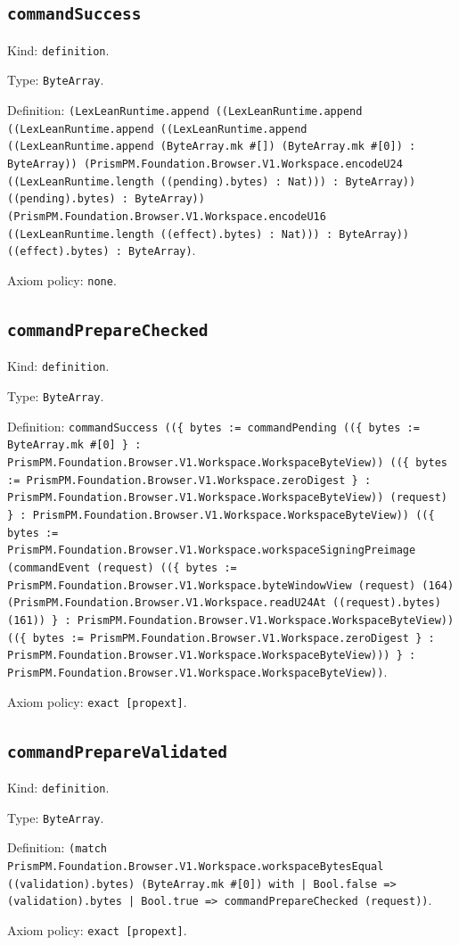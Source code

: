 \documentclass[11pt]{article}
\begin{document}
\subsection*{\texttt{commandSuccess}}
\noindent Kind: \texttt{definition}.\par
\noindent Type: \texttt{ByteArray}.\par
\noindent Definition: \texttt{(LexLeanRuntime.append ((LexLeanRuntime.append ((LexLeanRuntime.append ((LexLeanRuntime.append ((LexLeanRuntime.append (ByteArray.mk \#[]) (ByteArray.mk \#[0]) : ByteArray)) (PrismPM.Foundation.Browser.V1.Workspace.encodeU24 ((LexLeanRuntime.length ((pending).bytes) : Nat))) : ByteArray)) ((pending).bytes) : ByteArray)) (PrismPM.Foundation.Browser.V1.Workspace.encodeU16 ((LexLeanRuntime.length ((effect).bytes) : Nat))) : ByteArray)) ((effect).bytes) : ByteArray)}.\par
\noindent Axiom policy: \texttt{none}.\par
\subsection*{\texttt{commandPrepareChecked}}
\noindent Kind: \texttt{definition}.\par
\noindent Type: \texttt{ByteArray}.\par
\noindent Definition: \texttt{commandSuccess ((\{ bytes := commandPending ((\{ bytes := ByteArray.mk \#[0] \} : PrismPM.Foundation.Browser.V1.Workspace.WorkspaceByteView)) ((\{ bytes := PrismPM.Foundation.Browser.V1.Workspace.zeroDigest \} : PrismPM.Foundation.Browser.V1.Workspace.WorkspaceByteView)) (request) \} : PrismPM.Foundation.Browser.V1.Workspace.WorkspaceByteView)) ((\{ bytes := PrismPM.Foundation.Browser.V1.Workspace.workspaceSigningPreimage (commandEvent (request) ((\{ bytes := PrismPM.Foundation.Browser.V1.Workspace.byteWindowView (request) (164) (PrismPM.Foundation.Browser.V1.Workspace.readU24At ((request).bytes) (161)) \} : PrismPM.Foundation.Browser.V1.Workspace.WorkspaceByteView)) ((\{ bytes := PrismPM.Foundation.Browser.V1.Workspace.zeroDigest \} : PrismPM.Foundation.Browser.V1.Workspace.WorkspaceByteView))) \} : PrismPM.Foundation.Browser.V1.Workspace.WorkspaceByteView))}.\par
\noindent Axiom policy: \texttt{exact [propext]}.\par
\subsection*{\texttt{commandPrepareValidated}}
\noindent Kind: \texttt{definition}.\par
\noindent Type: \texttt{ByteArray}.\par
\noindent Definition: \texttt{(match PrismPM.Foundation.Browser.V1.Workspace.workspaceBytesEqual ((validation).bytes) (ByteArray.mk \#[0]) with | Bool.false => (validation).bytes | Bool.true => commandPrepareChecked (request))}.\par
\noindent Axiom policy: \texttt{exact [propext]}.\par
\end{document}
